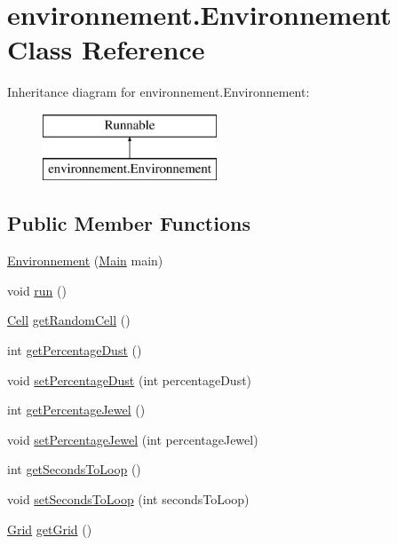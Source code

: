 \hypertarget{classenvironnement_1_1_environnement}{}\section{environnement.\+Environnement Class Reference}
\label{classenvironnement_1_1_environnement}
Inheritance diagram for environnement.\+Environnement\+:\begin{figure}[H]
\begin{center}
\leavevmode
\includegraphics[height=2.000000cm]{classenvironnement_1_1_environnement}
\end{center}
\end{figure}
\subsection*{Public Member Functions}
\begin{DoxyCompactItemize}
\item 
\hyperlink{classenvironnement_1_1_environnement_a664559901643eb5f45ddbf1ec082696b}{Environnement} (\hyperlink{classmain_1_1_main}{Main} main)
\item 
void \hyperlink{classenvironnement_1_1_environnement_a5b7c3fb51c2af94754725667c9a34098}{run} ()
\item 
\hyperlink{classenvironnement_1_1_cell}{Cell} \hyperlink{classenvironnement_1_1_environnement_aa11c05d0dd261136c31224419ecb037a}{get\+Random\+Cell} ()
\item 
int \hyperlink{classenvironnement_1_1_environnement_accb38c1ebc21db442c06f1c39f658853}{get\+Percentage\+Dust} ()
\item 
void \hyperlink{classenvironnement_1_1_environnement_ade3736e361839278d989c81627623b39}{set\+Percentage\+Dust} (int percentage\+Dust)
\item 
int \hyperlink{classenvironnement_1_1_environnement_ab7f263c3832088e66b3e0b2b27882580}{get\+Percentage\+Jewel} ()
\item 
void \hyperlink{classenvironnement_1_1_environnement_a9c0702025cafba8d78596edfb00e1f42}{set\+Percentage\+Jewel} (int percentage\+Jewel)
\item 
int \hyperlink{classenvironnement_1_1_environnement_a93730fe27fd562b41e84c6ae7272c2f1}{get\+Seconds\+To\+Loop} ()
\item 
void \hyperlink{classenvironnement_1_1_environnement_a7d2dde8f8108918651f8f8f8a4bfcdf5}{set\+Seconds\+To\+Loop} (int seconds\+To\+Loop)
\item 
\hyperlink{classenvironnement_1_1_grid}{Grid} \hyperlink{classenvironnement_1_1_environnement_addd77a3e76cf5eb6c3b0270916e4812a}{get\+Grid} ()
\end{DoxyCompactItemize}


